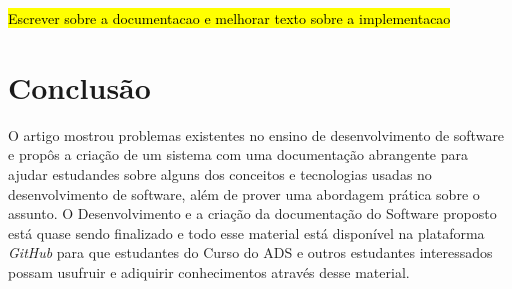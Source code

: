 \documentclass[12pt]{article}
\begin{document}
\hl{Escrever sobre a documentacao e melhorar texto sobre a implementacao}

\section{Conclusão}

O artigo mostrou problemas existentes no ensino de desenvolvimento de software e propôs
a criação de um sistema com uma documentação abrangente para ajudar estudandes sobre alguns dos
conceitos e tecnologias usadas no desenvolvimento de software, além de prover uma abordagem prática
sobre o assunto. O Desenvolvimento e a criação da documentação do Software proposto está
quase sendo finalizado e todo esse material está disponível na plataforma \textit{GitHub}
para que estudantes do Curso do ADS e outros estudantes interessados possam usufruir e adiquirir
conhecimentos através desse material.


\end{document}
